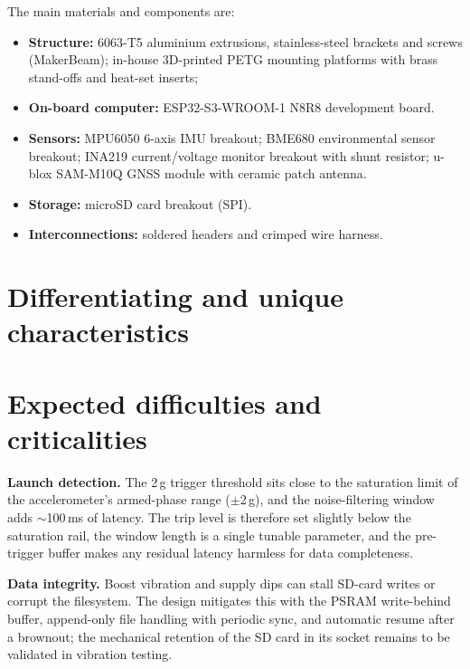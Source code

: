 The main materials and components are:

\begin{itemize}
    \item \textbf{Structure:} 6063-T5 aluminium extrusions, stainless-steel brackets and screws (MakerBeam); in-house 3D-printed PETG mounting platforms with brass stand-offs and heat-set inserts;
    \item \textbf{On-board computer:} ESP32-S3-WROOM-1 N8R8 development board.
    \item \textbf{Sensors:} MPU6050 6-axis IMU breakout; BME680 environmental sensor breakout; INA219 current/voltage monitor breakout with shunt resistor; u-blox SAM-M10Q GNSS module with ceramic patch antenna.
    \item \textbf{Storage:} microSD card breakout (SPI).
    \item \textbf{Interconnections:} soldered headers and crimped wire harness.
\end{itemize}

\chapter{Differentiating and unique characteristics}



\chapter{Expected difficulties and criticalities}

\textbf{Launch detection.} The 2\,g trigger threshold sits close to the
saturation limit of the accelerometer's armed-phase range ($\pm$2\,g), and
the noise-filtering window adds $\sim$100\,ms of latency. The trip level is
therefore set slightly below the saturation rail, the window length is a
single tunable parameter, and the pre-trigger buffer makes any residual
latency harmless for data completeness.

\textbf{Data integrity.} Boost vibration and supply dips can stall SD-card
writes or corrupt the filesystem. The design mitigates this with the PSRAM
write-behind buffer, append-only file handling with periodic sync, and
automatic resume after a brownout; the mechanical retention of the SD card in
its socket remains to be validated in vibration testing.

